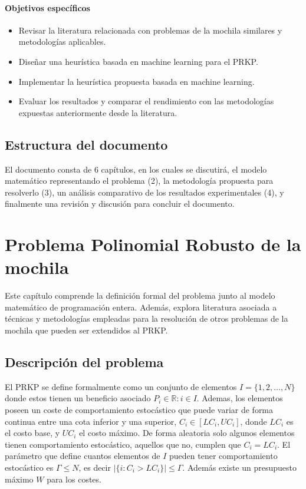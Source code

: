 \documentclass[spanish, a4paper, 12pt, openany,final]{book}
\begin{document}
\subsubsection*{Objetivos específicos}
\begin{itemize}
	\item Revisar la literatura relacionada con problemas de la mochila similares y metodologías aplicables.
	\item Diseñar una heurística basada en machine learning para el PRKP.
	\item Implementar la heurística propuesta basada en machine learning.
	\item Evaluar los resultados y comparar el rendimiento con las metodologías expuestas anteriormente desde la literatura.
\end{itemize}

\section{Estructura del documento}

El documento consta de 6 capítulos, en los cuales se discutirá, el modelo matemático representando el problema (2), la metodología propuesta para resolverlo (3), un análisis comparativo de los resultados experimentales (4), y finalmente una revisión y discusión para concluir el documento.

\clearpage

\chapter{Problema Polinomial Robusto de la mochila}
Este capítulo comprende la definición formal del problema junto al modelo matemático de programación entera. Además, explora literatura asociada a técnicas y metodologías empleadas para la resolución de otros problemas de la mochila que pueden ser extendidos al PRKP.

\section{Descripción del problema}
	El PRKP se define formalmente como un conjunto de elementos $I = \{1,2,\hdots,N\}$ donde estos tienen un beneficio asociado $P_i \in \mathbb{R}:i\in I$. Ademas, los elementos poseen un coste de comportamiento estocástico que puede variar de forma continua entre una cota inferior y una superior, $C_i \in [LC_i,UC_i]$, donde $LC_i$ es el costo base, y $UC_i$ el costo máximo. De forma aleatoria solo algunos elementos tienen comportamiento estocástico, aquellos que no, cumplen que $C_i = LC_i$. El parámetro que define cuantos elementos de $I$ pueden tener comportamiento estocástico es $\Gamma\leq N$, es decir $|\{i: C_i > LC_i\}| \leq \Gamma$. 	Además existe un presupuesto máximo $W$ para los costes.
	
\end{document}

